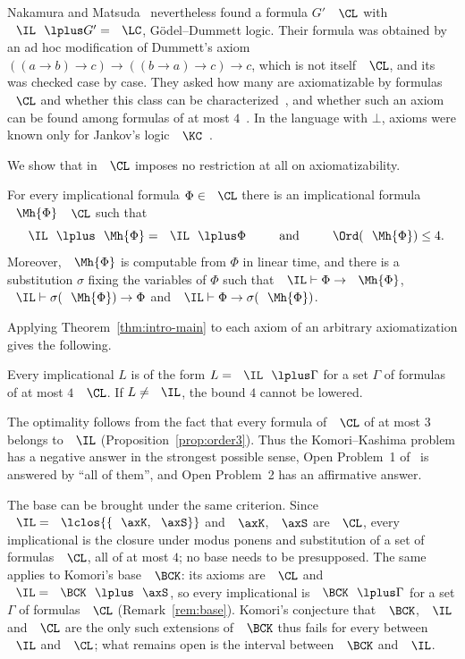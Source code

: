 Nakamura and Matsuda~\cite{NM21} nevertheless found a formula $G'$
 $\CL$ with $\IL\lplus G'=\LC$, Gödel--Dummett logic. Their
formula was obtained by an ad hoc modification of Dummett's axiom
$((a\to b)\to c)\to((b\to a)\to c)\to c$, which is not itself 
$\CL$, and its  was checked case by case. They asked how
many  are axiomatizable by formulas 
$\CL$ and whether this class can be characterized~\cite[Open
Problem~1]{NM21}, and whether such an axiom can be found among formulas of
 at most $4$~\cite[Open Problem~2]{NM21}. In the language with
$\bot$,  axioms were known only for Jankov's logic
$\KC$~\cite[Remark~1.1]{NM21}.

We show that  in $\CL$ imposes no restriction at all on
axiomatizability.

\begin{theorem}\label{thm:intro-main}
For every implicational formula $\Phi\in\CL$ there is an implicational
formula $\Mh{\Phi}$  $\CL$ such that
\[
\IL\lplus\Mh{\Phi}=\IL\lplus\Phi
\qquad\text{and}\qquad
\Ord(\Mh{\Phi})\le4 .
\]
Moreover, $\Mh{\Phi}$ is computable from $\Phi$ in linear time, and there is
a substitution $\sigma$ fixing the variables of $\Phi$ such that
$\IL\vdash\Phi\to\Mh{\Phi}$, $\IL\vdash\sigma(\Mh{\Phi})\to\Phi$ and
$\IL\vdash\Phi\to\sigma(\Mh{\Phi})$.
\end{theorem}

Applying Theorem~\ref{thm:intro-main} to each axiom of an arbitrary
axiomatization gives the following.

\begin{corollary}\label{cor:intro-all}
Every implicational  $L$ is of the form
$L=\IL\lplus\Gamma$ for a set $\Gamma$ of formulas of  at most $4$
 $\CL$. If $L\neq\IL$, the bound $4$ cannot be lowered.
\end{corollary}

The optimality follows from the fact that every formula of $\CL$ of
 at most $3$ belongs to $\IL$ (Proposition~\ref{prop:order3}).
Thus the Komori--Kashima problem has a negative answer in the strongest
possible sense, Open Problem~1 of~\cite{NM21} is answered by ``all of
them'', and Open Problem~2 has an affirmative answer.

The base  can be brought under the same criterion. Since
$\IL=\lclos{\{\axK,\axS\}}$ and $\axK$, $\axS$ are  $\CL$,
every implicational  is the closure under modus
ponens and substitution of a set of formulas  $\CL$, all of
 at most $4$; no base  needs to be presupposed. The same
applies to Komori's base $\BCK$: its axioms are  $\CL$ and
$\IL=\BCK\lplus\axS$, so every implicational  is
$\BCK\lplus\Gamma$ for a set $\Gamma$ of formulas  $\CL$
(Remark~\ref{rem:base}). Komori's conjecture that $\BCK$, $\IL$ and $\CL$
are the only such extensions of $\BCK$ thus fails for every 
between $\IL$ and $\CL$; what remains open is the interval between $\BCK$
and $\IL$.

